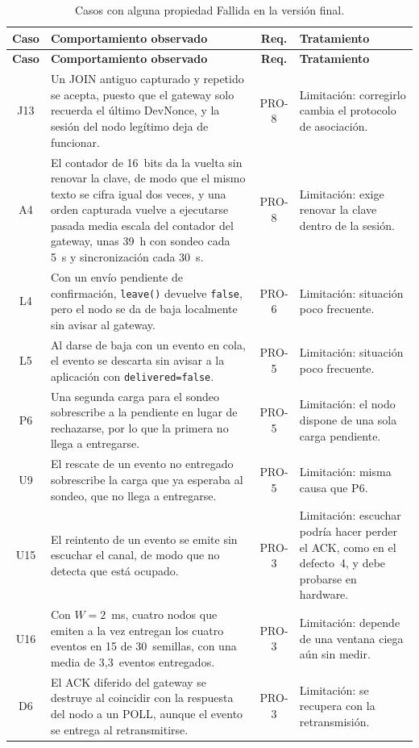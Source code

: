 {\small
\begin{longtable}{|c|p{8.2cm}|c|p{3.4cm}|}
\caption{\label{tab:fallidas} Casos con alguna propiedad Fallida en la versión final.}\\
\hline
\textbf{Caso} & \textbf{Comportamiento observado} & \textbf{Req.} & \textbf{Tratamiento} \\
\hline
\endfirsthead
\hline
\textbf{Caso} & \textbf{Comportamiento observado} & \textbf{Req.} & \textbf{Tratamiento} \\
\hline
\endhead
J13 & Un JOIN antiguo capturado y repetido se acepta, puesto que el gateway solo recuerda el último DevNonce, y la sesión del nodo legítimo deja de funcionar. & PRO-8 & Limitación: corregirlo cambia el protocolo de asociación. \\
\hline
A4 & El contador de 16~bits da la vuelta sin renovar la clave, de modo que el mismo texto se cifra igual dos veces, y una orden capturada vuelve a ejecutarse pasada media escala del contador del gateway, unas 39~h con sondeo cada 5~s y sincronización cada 30~s. & PRO-8 & Limitación: exige renovar la clave dentro de la sesión. \\
\hline
L4 & Con un envío pendiente de confirmación, \texttt{leave()} devuelve \texttt{false}, pero el nodo se da de baja localmente sin avisar al gateway. & PRO-6 & Limitación: situación poco frecuente. \\
\hline
L5 & Al darse de baja con un evento en cola, el evento se descarta sin avisar a la aplicación con \texttt{delivered=false}. & PRO-5 & Limitación: situación poco frecuente. \\
\hline
P6 & Una segunda carga para el sondeo sobrescribe a la pendiente en lugar de rechazarse, por lo que la primera no llega a entregarse. & PRO-5 & Limitación: el nodo dispone de una sola carga pendiente. \\
\hline
U9 & El rescate de un evento no entregado sobrescribe la carga que ya esperaba al sondeo, que no llega a entregarse. & PRO-5 & Limitación: misma causa que P6. \\
\hline
U15 & El reintento de un evento se emite sin escuchar el canal, de modo que no detecta que está ocupado. & PRO-3 & Limitación: escuchar podría hacer perder el ACK, como en el defecto~4, y debe probarse en hardware. \\
\hline
U16 & Con $W = 2$~ms, cuatro nodos que emiten a la vez entregan los cuatro eventos en 15 de 30~semillas, con una media de 3,3~eventos entregados. & PRO-3 & Limitación: depende de una ventana ciega aún sin medir. \\
\hline
D6 & El ACK diferido del gateway se destruye al coincidir con la respuesta del nodo a un POLL, aunque el evento se entrega al retransmitirse. & PRO-3 & Limitación: se recupera con la retransmisión. \\
\hline
\end{longtable}
}

